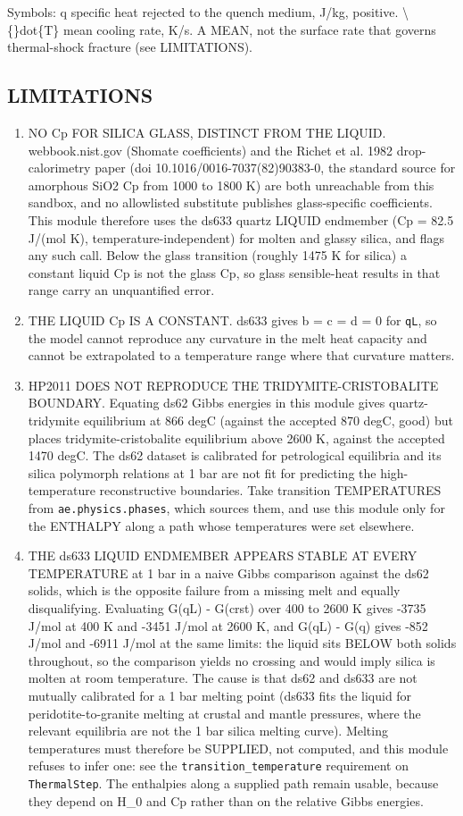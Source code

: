 \documentclass[10pt,a4paper,twoside]{report}
\begin{document}
Symbols: q        specific heat rejected to the quench medium, J/kg, positive. \textbackslash\{\}dot\{T\}  mean cooling rate, K/s. A MEAN, not the surface rate that governs thermal-shock fracture (see LIMITATIONS).

\subsection*{LIMITATIONS}

\begin{enumerate}[leftmargin=*,label=\arabic*.]
\item NO Cp FOR SILICA GLASS, DISTINCT FROM THE LIQUID. webbook.nist.gov (Shomate coefficients) and the Richet et al. 1982 drop-calorimetry paper (doi 10.1016/0016-7037(82)90383-0, the standard source for amorphous SiO2 Cp from 1000 to 1800 K) are both unreachable from this sandbox, and no allowlisted substitute publishes glass-specific coefficients. This module therefore uses the ds633 quartz LIQUID endmember (Cp = 82.5 J/(mol K), temperature-independent) for molten and glassy silica, and flags any such call. Below the glass transition (roughly 1475 K for silica) a constant liquid Cp is not the glass Cp, so glass sensible-heat results in that range carry an unquantified error.
\item THE LIQUID Cp IS A CONSTANT. ds633 gives b = c = d = 0 for \texttt{qL}, so the model cannot reproduce any curvature in the melt heat capacity and cannot be extrapolated to a temperature range where that curvature matters.
\item HP2011 DOES NOT REPRODUCE THE TRIDYMITE-CRISTOBALITE BOUNDARY. Equating ds62 Gibbs energies in this module gives quartz-tridymite equilibrium at 866 degC (against the accepted 870 degC, good) but places tridymite-cristobalite equilibrium above 2600 K, against the accepted 1470 degC. The ds62 dataset is calibrated for petrological equilibria and its silica polymorph relations at 1 bar are not fit for predicting the high-temperature reconstructive boundaries. Take transition TEMPERATURES from \texttt{ae.physics.phases}, which sources them, and use this module only for the ENTHALPY along a path whose temperatures were set elsewhere.
\item THE ds633 LIQUID ENDMEMBER APPEARS STABLE AT EVERY TEMPERATURE at 1 bar in a naive Gibbs comparison against the ds62 solids, which is the opposite failure from a missing melt and equally disqualifying. Evaluating G(qL) - G(crst) over 400 to 2600 K gives -3735 J/mol at 400 K and -3451 J/mol at 2600 K, and G(qL) - G(q) gives -852 J/mol and -6911 J/mol at the same limits: the liquid sits BELOW both solids throughout, so the comparison yields no crossing and would imply silica is molten at room temperature. The cause is that ds62 and ds633 are not mutually calibrated for a 1 bar melting point (ds633 fits the liquid for peridotite-to-granite melting at crustal and mantle pressures, where the relevant equilibria are not the 1 bar silica melting curve). Melting temperatures must therefore be SUPPLIED, not computed, and this module refuses to infer one: see the \texttt{transition\_temperature} requirement on \texttt{ThermalStep}. The enthalpies along a supplied path remain usable, because they depend on H\_0 and Cp rather than on the relative Gibbs energies.

\end{enumerate}
\end{document}
